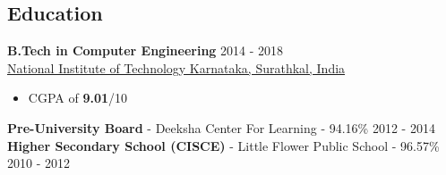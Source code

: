 \documentclass[margin, centered]{res}
\begin{document}
\begin{resume}

\section{Education}
\textbf{B.Tech in Computer Engineering} \hfill 2014 - 2018 \\
\href{http://nitk.ac.in/}{National Institute of Technology Karnataka, Surathkal, India}
\begin{itemize}
 \item CGPA of \textbf{9.01}/10
\end{itemize}
\textbf{Pre-University Board} - {Deeksha Center For Learning} - 94.16\% \hfill 2012 - 2014 \\
\textbf{Higher Secondary School (CISCE) } - Little Flower Public School - 96.57\% \hfill 2010 - 2012
 

\end{resume}
\end{document}
